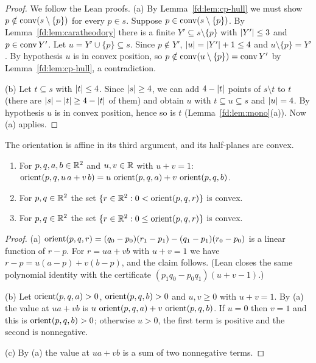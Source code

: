 \begin{proof}
We follow the Lean proofs. (a) By Lemma~\ref{fd:lem:cp-hull} we must show $p\notin\operatorname{conv}(s\setminus\{p\})$
for every $p\in s$. Suppose $p\in\operatorname{conv}(s\setminus\{p\})$. By Lemma~\ref{fd:lem:caratheodory} there is a
finite $Y'\subseteq s\setminus\{p\}$ with $\lvert Y'\rvert\le3$ and $p\in\operatorname{conv} Y'$. Let $u=Y'\cup\{p\}\subseteq s$.
Since $p\notin Y'$, $\lvert u\rvert=\lvert Y'\rvert+1\le4$ and $u\setminus\{p\}=Y'$. By hypothesis $u$ is in convex
position, so $p\notin\operatorname{conv}(u\setminus\{p\})=\operatorname{conv} Y'$ by Lemma~\ref{fd:lem:cp-hull}, a contradiction.

(b) Let $t\subseteq s$ with $\lvert t\rvert\le4$. Since $\lvert s\rvert\ge4$, we can add $4-\lvert t\rvert$ points of
$s\setminus t$ to $t$ (there are $\lvert s\rvert-\lvert t\rvert\ge4-\lvert t\rvert$ of them) and obtain $u$ with
$t\subseteq u\subseteq s$ and $\lvert u\rvert=4$. By hypothesis $u$ is in convex position, hence so is $t$
(Lemma~\ref{fd:lem:mono}(a)). Now (a) applies.
\end{proof}

\begin{lemma}\label{fd:lem:halfplane}\raggedright
The orientation is affine in its third argument, and its half-planes are convex.
\begin{enumerate}[label=(\alph*)]
\item For $p,q,a,b\in\mathbb R^2$ and $u,v\in\mathbb R$ with $u+v=1$:
  $\operatorname{orient}(p,q,u\,a+v\,b)=u\,\operatorname{orient}(p,q,a)+v\,\operatorname{orient}(p,q,b)$.
\item For $p,q\in\mathbb R^2$ the set $\{r\in\mathbb R^2:0<\operatorname{orient}(p,q,r)\}$ is convex.
\item For $p,q\in\mathbb R^2$ the set $\{r\in\mathbb R^2:0\le\operatorname{orient}(p,q,r)\}$ is convex.
\end{enumerate}
\end{lemma}

\begin{proof}
(a) $\operatorname{orient}(p,q,r)=(q_0-p_0)(r_1-p_1)-(q_1-p_1)(r_0-p_0)$ is a linear function of $r-p$. For
$r=ua+vb$ with $u+v=1$ we have $r-p=u(a-p)+v(b-p)$, and the claim follows. (Lean closes the same
polynomial identity with the certificate $(p_1q_0-p_0q_1)(u+v-1)$.)

(b) Let $\operatorname{orient}(p,q,a)>0$, $\operatorname{orient}(p,q,b)>0$ and $u,v\ge0$ with $u+v=1$. By (a) the value at $ua+vb$ is
$u\,\operatorname{orient}(p,q,a)+v\,\operatorname{orient}(p,q,b)$. If $u=0$ then $v=1$ and this is $\operatorname{orient}(p,q,b)>0$; otherwise
$u>0$, the first term is positive and the second is nonnegative.

(c) By (a) the value at $ua+vb$ is a sum of two nonnegative terms.
\end{proof}

